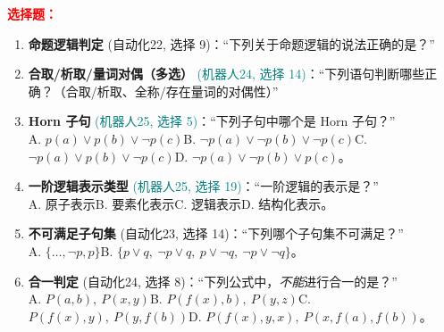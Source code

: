﻿\documentclass[../main.tex]{subfiles}
\begin{document}
\noindent\textbf{\textcolor{red}{选择题：}}
\begin{enumerate}[itemsep=0.45em, topsep=0.2em, leftmargin=1.5em]
    \item \textbf{命题逻辑判定} \textcolor{autoclassgreen}{(自动化22, 选择 9)}：``下列关于命题逻辑的说法正确的是？''\\
     

    \item \textbf{合取/析取/量词对偶（多选）} \textcolor{teal}{(机器人24, 选择 14)}：``下列语句判断哪些正确？（合取/析取、全称/存在量词的对偶性）''\\
     

    \item \textbf{Horn 子句} \textcolor{teal}{(机器人25, 选择 5)}：``下列子句中哪个是 Horn 子句？''\\
    A. $p(a)\lor p(b)\lor\lnot p(c)$\quad B. $\lnot p(a)\lor\lnot p(b)\lor\lnot p(c)$\quad C. $\lnot p(a)\lor p(b)\lor\lnot p(c)$\quad D. $\lnot p(a)\lor\lnot p(b)\lor p(c)$。 

    \item \textbf{一阶逻辑表示类型} \textcolor{teal}{(机器人25, 选择 19)}：``一阶逻辑的表示是？''\\
    A. 原子表示\quad B. 要素化表示\quad C. 逻辑表示\quad D. 结构化表示。 

    \item \textbf{不可满足子句集} \textcolor{autoclassgreen}{(自动化23, 选择 14)}：``下列哪个子句集不可满足？''\\
    A. $\{\dots,\lnot p, p\}$\quad B. $\{p\lor q,\ \lnot p\lor q,\ p\lor\lnot q,\ \lnot p\lor\lnot q\}$\quad {}\quad {}。 

    \item \textbf{合一判定} \textcolor{autoclassgreen}{(自动化24, 选择 8)}：``下列公式中，\emph{不能}进行合一的是？''\\
    A. $P(a,b),\ P(x,y)$\quad B. $P(f(x),b),\ P(y,z)$\quad C. $P(f(x),y),\ P(y,f(b))$\quad D. $P(f(x),y,x),\ P(x,f(a),f(b))$。 


\end{enumerate}
\end{document}
